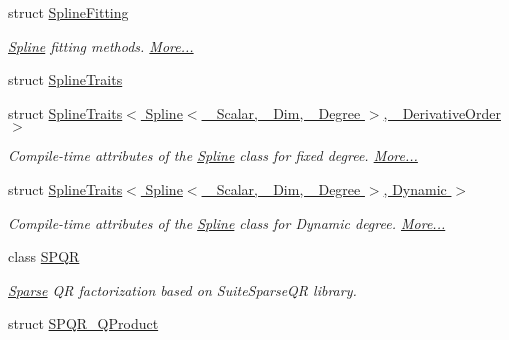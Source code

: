 \begin{DoxyCompactItemize}
struct \hyperlink{group___splines___module_struct_eigen_1_1_spline_fitting}{Spline\+Fitting}
\begin{DoxyCompactList}\small\item\em \hyperlink{group___splines___module_class_eigen_1_1_spline}{Spline} fitting methods.  \hyperlink{group___splines___module_struct_eigen_1_1_spline_fitting}{More...}\end{DoxyCompactList}\item 
struct \hyperlink{struct_eigen_1_1_spline_traits}{Spline\+Traits}
\item 
struct \hyperlink{group___splines___module_struct_eigen_1_1_spline_traits_3_01_spline_3_01___scalar_00_01___dim_00_01___degree_01_4_00_01___derivative_order_01_4}{Spline\+Traits$<$ Spline$<$ \+\_\+\+Scalar, \+\_\+\+Dim, \+\_\+\+Degree $>$, \+\_\+\+Derivative\+Order $>$}
\begin{DoxyCompactList}\small\item\em Compile-\/time attributes of the \hyperlink{group___splines___module_class_eigen_1_1_spline}{Spline} class for fixed degree.  \hyperlink{group___splines___module_struct_eigen_1_1_spline_traits_3_01_spline_3_01___scalar_00_01___dim_00_01___degree_01_4_00_01___derivative_order_01_4}{More...}\end{DoxyCompactList}\item 
struct \hyperlink{group___splines___module_struct_eigen_1_1_spline_traits_3_01_spline_3_01___scalar_00_01___dim_00_01___degree_01_4_00_01_dynamic_01_4}{Spline\+Traits$<$ Spline$<$ \+\_\+\+Scalar, \+\_\+\+Dim, \+\_\+\+Degree $>$, Dynamic $>$}
\begin{DoxyCompactList}\small\item\em Compile-\/time attributes of the \hyperlink{group___splines___module_class_eigen_1_1_spline}{Spline} class for Dynamic degree.  \hyperlink{group___splines___module_struct_eigen_1_1_spline_traits_3_01_spline_3_01___scalar_00_01___dim_00_01___degree_01_4_00_01_dynamic_01_4}{More...}\end{DoxyCompactList}\item 
class \hyperlink{class_eigen_1_1_s_p_q_r}{S\+P\+QR}
\begin{DoxyCompactList}\small\item\em \hyperlink{struct_eigen_1_1_sparse}{Sparse} QR factorization based on Suite\+Sparse\+QR library. \end{DoxyCompactList}\item 
struct \hyperlink{struct_eigen_1_1_s_p_q_r___q_product}{S\+P\+Q\+R\+\_\+\+Q\+Product}
\item 

\end{DoxyCompactItemize}
